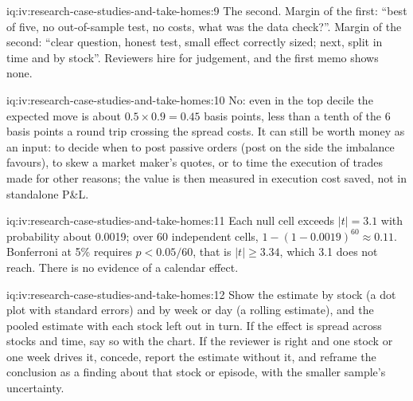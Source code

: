 \begin{solution}{iq:iv:research-case-studies-and-take-homes:9}
The second. Margin of the first: ``best of five, no out-of-sample test, no costs, what was the data check?''. Margin of the
second: ``clear question, honest test, small effect correctly sized; next, split in time and by stock''. Reviewers hire for
judgement, and the first memo shows none.
\end{solution}

\begin{solution}{iq:iv:research-case-studies-and-take-homes:10}
No: even in the top decile the expected move is about $0.5 \times 0.9 = 0.45$ basis points, less than a tenth of the 6 basis
points a round trip crossing the spread costs. It can still be worth money as an input: to decide when to post passive orders
(post on the side the imbalance favours), to skew a market maker's quotes, or to time the execution of trades made for other
reasons; the value is then measured in execution cost saved, not in standalone P\&L.
\end{solution}

\begin{solution}{iq:iv:research-case-studies-and-take-homes:11}
Each null cell exceeds $|t| = 3.1$ with probability about 0.0019; over 60 independent cells, $1 - (1 - 0.0019)^{60} \approx
0.11$. Bonferroni at 5\% requires $p < 0.05/60$, that is $|t| \ge 3.34$, which 3.1 does not reach. There is no evidence of a
calendar effect.
\end{solution}

\begin{solution}{iq:iv:research-case-studies-and-take-homes:12}
Show the estimate by stock (a dot plot with standard errors) and by week or day (a rolling estimate), and the pooled estimate
with each stock left out in turn. If the effect is spread across stocks and time, say so with the chart. If the reviewer is
right and one stock or one week drives it, concede, report the estimate without it, and reframe the conclusion as a finding
about that stock or episode, with the smaller sample's uncertainty.
\end{solution}
